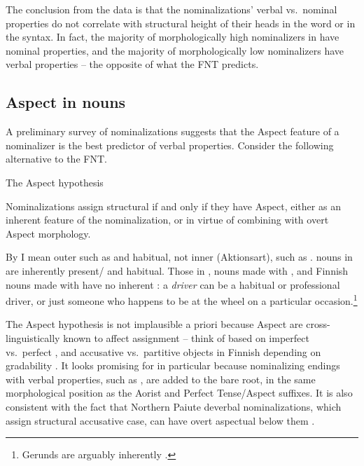 \documentclass[output=paper,
modfonts
]{LSP/langsci}
\def\urf#1{$^{\textrm{\scriptsize{#1}}}$}
\begin{document}
The conclusion from the  data is that the nominalizations' verbal vs.\ nominal properties
do not correlate with structural height of their heads in the word or in the syntax.  In fact,
the majority of morphologically high nominalizers in  have nominal properties, and the
majority of morphologically low nominalizers have verbal properties – the opposite of what the FNT
predicts.


\subsection{Aspect in   nouns}
\label{vedtensesection}
A preliminary survey of nominalizations suggests that the Aspect feature of a
nominalizer is the best predictor of verbal properties.  Consider the following alternative to
the FNT.
\begin{exe}
\ex\label{TAH}
The Aspect hypothesis

Nominalizations assign structural  if and only if they have Aspect, either as an
inherent feature of the nominalization, or in virtue of combining with overt Aspect morphology.
\end{exe}
By   I mean outer   such as  and habitual, not inner
 (Aktionsart), such as .    nouns in \form{′-tar-\urf{V}} are
inherently present/ and habitual.  Those in \form{-{tár-}\urf{N}}, 
 nouns made with  , and Finnish  nouns made with
 have no inherent : a \textit{driver} can be a habitual or professional
driver, or just someone who happens to be at the wheel on a particular
occasion.\footnote{Gerunds are arguably inherently  \citep{alexiadou2001,alexiadou2010}.}

The Aspect hypothesis is not implausible a priori because Aspect  are
cross-linguistically known to affect  assignment  – think of 
based on imperfect vs.\ perfect , and accusative vs.\ partitive objects in Finnish
depending on gradability \citep{kiparsky2005b}.  It looks promising
for   in particular because nominalizing endings with verbal properties, such as
\form{′-tar-\urf{V}}, are added to the bare root, in the same morphological position as the
Aorist and Perfect Tense/Aspect suffixes.  It is also consistent with the fact that Northern
Paiute deverbal nominalizations, which assign structural accusative case, can have overt
aspectual  below them \citep[793, fn.\ 6]{toosarvandani2014}.
\end{document}
